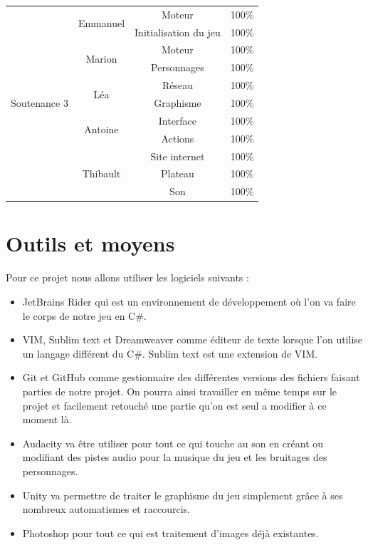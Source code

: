 \documentclass[12pt]{extarticle}
\begin{document}
\begin{table}[!ht]
\begin{center}
\begin{tabular}{ | c | c | c | c | }
			\multirow{11}{*}{Soutenance 3} & \multirow{2}{*}{Emmanuel} & Moteur & 100\% \\ \cline{3-4}
			&& Initialisation du jeu & 100\% \\ \cline{2-4}
			& \multirow{2}{*}{Marion} & Moteur & 100\% \\ \cline{3-4}
			&& Personnages & 100\% \\ \cline{2-4}
			& \multirow{2}{*}{Léa} & Réseau & 100\% \\ \cline{3-4}
			&& Graphisme & 100\% \\ \cline{2-4}
			& \multirow{2}{*}{Antoine} & Interface & 100\% \\ \cline{3-4}
			&& Actions & 100\% \\ \cline{2-4}
			& \multirow{3}{*}{Thibault} & Site internet & 100\% \\ \cline{3-4}
			&& Plateau & 100\% \\ \cline{3-4}
			&& Son & 100\% \\ \hline
		\end{tabular}
	\end{center}
\end{table}

\section{Outils et moyens}

Pour ce projet nous allons utiliser les logiciels suivants :
\begin{itemize}[label=\textbullet]
	\item JetBrains Rider qui est un environnement de développement où l'on va faire le corps de notre jeu en C\#.
	\item VIM, Sublim text et Dreamweaver comme éditeur de texte lorsque l'on utilise un langage différent du C\#. Sublim text est une extension de VIM.
	\item Git et GitHub comme gestionnaire des différentes versions des fichiers faisant parties de notre projet. On pourra ainsi travailler en même temps sur le projet et facilement retouché une partie qu'on est seul a modifier à ce moment là.
	\item Audacity va être utiliser pour tout ce qui touche au son en créant ou modifiant des pistes audio pour la musique du jeu et les bruitages des personnages.
	\item Unity va permettre de traiter le graphisme du jeu simplement grâce à ses nombreux automatismes et raccourcis.
	\item Photoshop pour tout ce qui est traitement d'images déjà existantes.
\end{itemize}
\end{document}
